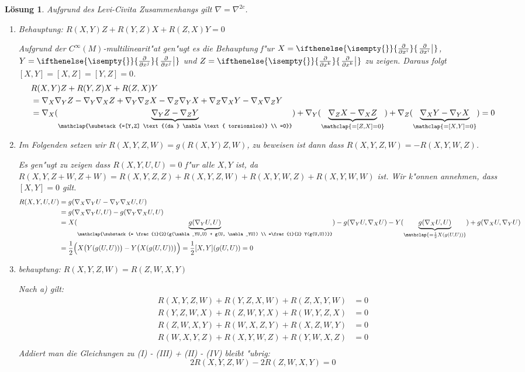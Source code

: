 \documentclass[paper=A4, twoside, chapterprefix=true, bibliography=totoc, headsepline]{scrbook}
\newcommand{\pdifffrac}[3][]{\ifthenelse{\isempty{#1}}{\frac{\partial #2}{\partial #3}}{\left. \frac{\partial #2}{\partial #3} \right|_{#1}}}
\theoremstyle{plain}
\theoremstyle{nonumberplain}
\theoremstyle{empty}
\theoremstyle{break}
\newtheorem{Loes}{L\"osung}
\begin{document}
\begin{Loes}
Aufgrund des Levi-Civita Zusammenhangs gilt $\nabla = \nabla^{2c}$.
\begin{enumerate}[label=\alph*),leftmargin=*,widest=b]
\item
	\emph{Behauptung:} $R(X,Y)Z + R(Y,Z)X + R(Z,X)Y = 0$
	
	Aufgrund der $C^\infty(M)$-multilinearit"at gen"ugt es die Behauptung f"ur $X=\pdifffrac{}{x^{i}}$, $Y=\pdifffrac{}{x^{j}}$ und $Z=\pdifffrac{}{x^{k}}$ zu zeigen. Daraus folgt $[X,Y] = [X,Z] = [Y,Z] = 0$.
	\begin{align*}
		{}&R(X,Y)Z + R(Y,Z)X + R(Z,X)Y\\
		{}&= \nabla_X\nabla_Y Z - \nabla_Y\nabla_X Z + \nabla_Y\nabla_Z X - \nabla_Z\nabla_Y X + \nabla_Z\nabla_X Y - \nabla_X\nabla_Z Y\\
		{}&= \nabla_X(\underbrace{\nabla_YZ-\nabla_ZY}_{\mathclap{\substack{=[Y,Z] \text{(da } \nabla \text{ torsionslos)} \\ =0}}}) + \nabla_Y(\underbrace{\nabla_ZX-\nabla_XZ}_{\mathclap{=[Z,X]=0}}) + \nabla_Z(\underbrace{\nabla_XY-\nabla_YX}_{\mathclap{=[X,Y]=0}}) = 0
	\end{align*}
\item
	Im Folgenden setzen wir $R(X,Y,Z,W) = g(R(X,Y)Z,W)$, zu beweisen ist dann dass $R(X,Y,Z,W) = -R(X,Y,W,Z)$.
	
	Es gen"ugt zu zeigen dass $R(X,Y,U,U) = 0$ f"ur alle $X,Y$ ist, da $R(X,Y,Z+W,Z+W) = R(X,Y,Z,Z) + R(X,Y,Z,W) + R(X,Y,W,Z) + R(X,Y,W,W)$ ist. Wir k"onnen annehmen, dass $[X,Y] = 0$ gilt.
	\begin{align*}
		R(X,Y,U,U) &= g(\nabla_X\nabla_YU - \nabla_Y\nabla_XU, U)\\
		&= g(\nabla_X\nabla_YU, U) - g(\nabla_Y\nabla_XU, U)\\
		&= X(\underbrace{g(\nabla_YU, U)}_{\mathclap{\substack{= \frac{1}{2}(g(\nabla_YU,U) + g(U, \nabla_YU)) \\ =\frac{1}{2} Y(g(U,U))}}}) - g(\nabla_YU, \nabla_XU) - Y(\underbrace{g(\nabla_XU, U)}_{\mathclap{=\frac{1}{2}X(g(U,U))}}) + g(\nabla_XU, \nabla_YU)\\
		&= \frac{1}{2} \Big( X\big(Y(g(U,U))\big) - Y\big(X(g(U,U))\big) \Big) = \frac{1}{2} [X,Y] (g(U,U)) = 0
	\end{align*}
\item
	\emph{behauptung:} $R(X,Y,Z,W) = R(Z,W,X,Y)$
	
	Nach a) gilt:
	\begin{align*}
		R(X,Y,Z,W) + R(Y,Z,X,W) + R(Z,X,Y,W) &= 0 \tag{I}\\
		R(Y,Z,W,X) + R(Z,W,Y,X) + R(W,Y,Z,X) &= 0 \tag{II}\\
		R(Z,W,X,Y) + R(W,X,Z,Y) + R(X,Z,W,Y) &= 0 \tag{III}\\
		R(W,X,Y,Z) + R(X,Y,W,Z) + R(Y,W,X,Z) &= 0 \tag{IV}\\
	\end{align*}
	Addiert man die Gleichungen zu (I) - (III) + (II) - (IV) bleibt "ubrig:
		\[ 2 R(X,Y,Z,W) - 2 R(Z,W,X,Y) = 0 \]
\end{enumerate}\end{Loes}
\end{document}
